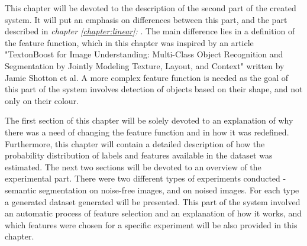 This chapter will be devoted to the description of the second part of the created system. It will put an emphasis on differences between this part, and the part described in \textit{chapter \ref{chapter:linear}: }. The main difference lies in a definition of the feature function, which in this chapter was inspired by an article "TextonBoost for Image Understanding:
Multi-Class Object Recognition and Segmentation by
Jointly Modeling Texture, Layout, and Context" \cite{article_main} written by Jamie Shotton et al. A more complex feature function is needed as the goal of this part of the system involves detection of objects based on their shape, and not only on their colour.

The first section of this chapter will be solely devoted to an explanation of why there was a need of changing the feature function and in how it was redefined. Furthermore, this chapter will contain a detailed description of how the probability distribution of labels and features available in the dataset was estimated. The next two sections will be devoted to an overview of the experimental part. There were two different types of experiments conducted - semantic segmentation on noise-free images, and on noised images. For each type a generated dataset generated will be presented. This part of the system involved an automatic process of feature selection and an explanation of how it works, and which features were chosen for a specific experiment will be also provided in this chapter.  